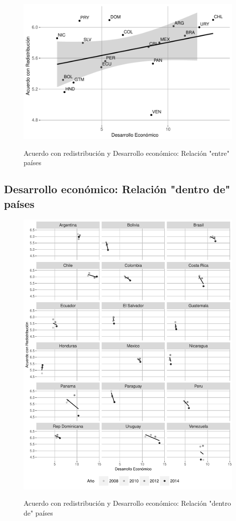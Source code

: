 \documentclass[12pt,letterpaper]{article}
\begin{document}
\begin{center}
	\begin{figure}[H]
		\caption[Acuerdo con redistribución y Desarrollo económico: Relación "entre" países]{Acuerdo con redistribución y Desarrollo económico: Relación "entre" países}
		\includegraphics[width=1\textwidth]{G5a.pdf}
		\label{fig:g7}
	\end{figure}
\end{center}

\newpage


\subsection{Desarrollo económico: Relación "dentro de" países \label{sec:sec65}}


\begin{center}
		\begin{figure}[H]
		\caption[Acuerdo con redistribución y Desarrollo económico: Relación "dentro de" países.]{Acuerdo con redistribución y Desarrollo económico: Relación "dentro de" países}
		\includegraphics[width=1\textwidth]{G5c.pdf}
		\label{fig:g8}
	\end{figure}
\end{center}
\end{document}
